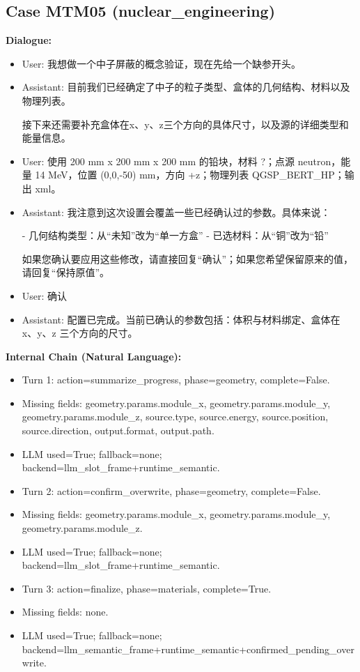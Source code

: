 \documentclass[11pt]{ctexart}
\begin{document}
\subsection{Case MTM05 (nuclear\_engineering)}
\textbf{Dialogue:}
\begin{itemize}
\item User: 我想做一个中子屏蔽的概念验证，现在先给一个缺参开头。
\item Assistant: 目前我们已经确定了中子的粒子类型、盒体的几何结构、材料以及物理列表。

接下来还需要补充盒体在x、y、z三个方向的具体尺寸，以及源的详细类型和能量信息。
\item User: 使用 200 mm x 200 mm x 200 mm 的铅块，材料 ?；点源 neutron，能量 14 MeV，位置 (0,0,-50) mm，方向 +z；物理列表 QGSP\_BERT\_HP；输出 xml。
\item Assistant: 我注意到这次设置会覆盖一些已经确认过的参数。具体来说：

- 几何结构类型：从“未知”改为“单一方盒”
- 已选材料：从“铜”改为“铅”

如果您确认要应用这些修改，请直接回复“确认”；如果您希望保留原来的值，请回复“保持原值”。
\item User: 确认
\item Assistant: 配置已完成。当前已确认的参数包括：体积与材料绑定、盒体在 x、y、z 三个方向的尺寸。
\end{itemize}
\textbf{Internal Chain (Natural Language):}
\begin{itemize}
\item Turn 1: action=summarize\_progress, phase=geometry, complete=False.
\item Missing fields: geometry.params.module\_x, geometry.params.module\_y, geometry.params.module\_z, source.type, source.energy, source.position, source.direction, output.format, output.path.
\item LLM used=True; fallback=none; backend=llm\_slot\_frame+runtime\_semantic.
\item Turn 2: action=confirm\_overwrite, phase=geometry, complete=False.
\item Missing fields: geometry.params.module\_x, geometry.params.module\_y, geometry.params.module\_z.
\item LLM used=True; fallback=none; backend=llm\_slot\_frame+runtime\_semantic.
\item Turn 3: action=finalize, phase=materials, complete=True.
\item Missing fields: none.
\item LLM used=True; fallback=none; backend=llm\_semantic\_frame+runtime\_semantic+confirmed\_pending\_overwrite.
\end{itemize}
\end{document}
